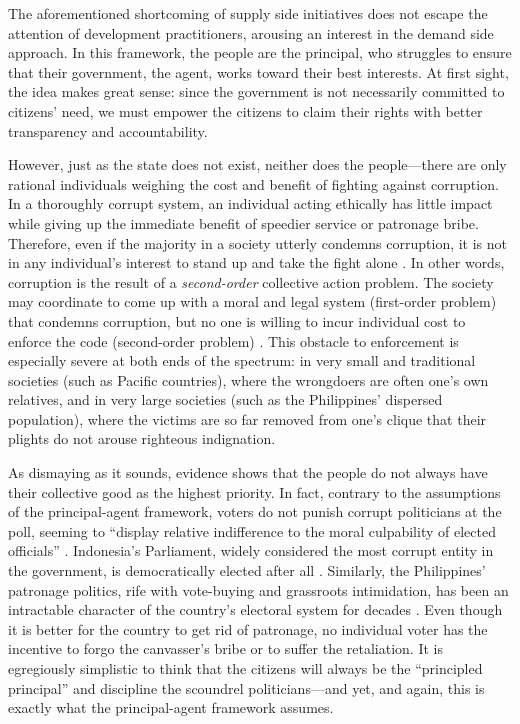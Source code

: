 \documentclass[12pt]{article}
\begin{document}
The aforementioned shortcoming of supply side initiatives does not escape the attention of development practitioners, arousing an interest in the demand side approach. In this framework, the people are the principal, who struggles to ensure that their government, the agent, works toward their best interests. At first sight, the idea makes great sense: since the government is not necessarily committed to citizens' need, we must empower the citizens to claim their rights with better transparency and accountability.

However, just as the state does not exist, neither does the people---there are only rational individuals weighing the cost and benefit of fighting against corruption. In a thoroughly corrupt system, an individual acting ethically has little impact while giving up the immediate benefit of speedier service or patronage bribe. Therefore, even if the majority in a society utterly condemns corruption, it is not in any individual's interest to stand up and take the fight alone \citep{Persson2010}. In other words, corruption is the result of a \textit{second-order} collective action problem. The society may coordinate to come up with a moral and legal system (first-order problem) that condemns corruption, but no one is willing to incur individual cost to enforce the code (second-order problem) \citep{Heckathorn1989}. This obstacle to enforcement is especially severe at both ends of the spectrum: in very small and traditional societies (such as Pacific countries), where the wrongdoers are often one's own relatives, and in very large societies (such as the Philippines' dispersed population), where the victims are so far removed from one's clique that their plights do not arouse righteous indignation.

As dismaying as it sounds, evidence shows that the people do not always have their collective good as the highest priority. In fact, contrary to the assumptions of the principal-agent framework, voters do not punish corrupt politicians at the poll, seeming to ``display relative indifference to the moral culpability of elected officials'' \citep{Chang2007}. Indonesia's Parliament, widely considered the most corrupt entity in the government, is democratically elected after all \citep{Integrity2012a}. Similarly, the Philippines' patronage politics, rife with vote-buying and grassroots intimidation, has been an intractable character of the country's electoral system for decades \citep{Sidel1999}. Even though it is better for the country to get rid of patronage, no individual voter has the incentive to forgo the canvasser's bribe or to suffer the retaliation. It is egregiously simplistic to think that the citizens will always be the ``principled principal'' and discipline the scoundrel politicians---and yet, and again, this is exactly what the principal-agent framework assumes.
\end{document}
